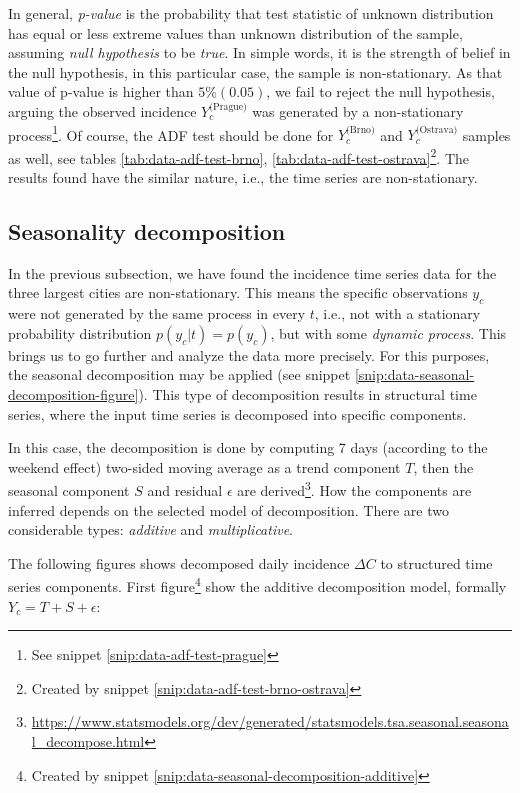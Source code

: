 \documentclass[
  digital, %
  oneside, %
  lof,     %
  lot,     %
]{fithesis4}
\begin{document}


In general, \textit{p-value} is the probability that test statistic 
of unknown distribution has equal or less extreme values 
than unknown distribution of the sample, assuming \textit{null 
hypothesis} to be \textit{true}. In simple words, it is the strength 
of belief in the null hypothesis, in this particular case, the sample is 
non-stationary. 
As that value of p-value is higher than $5\% (0.05)$, we fail to reject 
the null hypothesis, arguing the observed incidence 
$Y_c^\text{(Prague)}$ was generated by a non-stationary 
process\footnote{See snippet \ref{snip:data-adf-test-prague}}. 
Of course, the ADF test should be done for $Y_c^\text{(Brno)}$ 
and $Y_c^\text{(Ostrava)}$ samples as well, 
see tables \ref{tab:data-adf-test-brno}, \ref{tab:data-adf-test-ostrava}\footnote{Created by snippet \ref{snip:data-adf-test-brno-ostrava}}.
The results found have the similar nature, i.e.,
the time series are non-stationary.

\subsection{Seasonality decomposition}
\label{sec:seasonality-decomposition}

In the previous subsection, we have found the incidence time 
series data for the three largest cities are non-stationary. 
This means the specific observations $y_{c}$ were not 
generated by the same process in every $t$, i.e., not with a stationary probability
distribution $p(y_c | t) = p(y_c)$, but with some \textit{dynamic process}. 
This brings us to go further and analyze the data more precisely. 
For this purposes, the seasonal decomposition may be applied 
(see snippet \ref{snip:data-seasonal-decomposition-figure}). 
This type of decomposition results in structural time series, 
where the input time series is decomposed into specific 
components.

In this case, the decomposition is done by computing 7 days
(according to the weekend effect) 
two-sided moving average as a trend component $T$, then the 
seasonal component $S$ and residual $\epsilon$ are derived\footnote{\url{https://www.statsmodels.org/dev/generated/statsmodels.tsa.seasonal.seasonal_decompose.html}}. 
How the components are inferred depends on the selected model 
of decomposition. There are two considerable types: 
\textit{additive} and \textit{multiplicative}.

The following figures shows decomposed daily incidence 
$\Delta C$ to structured time series components. 
First figure\footnote{Created by snippet \ref{snip:data-seasonal-decomposition-additive}} show the additive decomposition model, 
formally $Y_c = T + S + \epsilon$:
\end{document}
